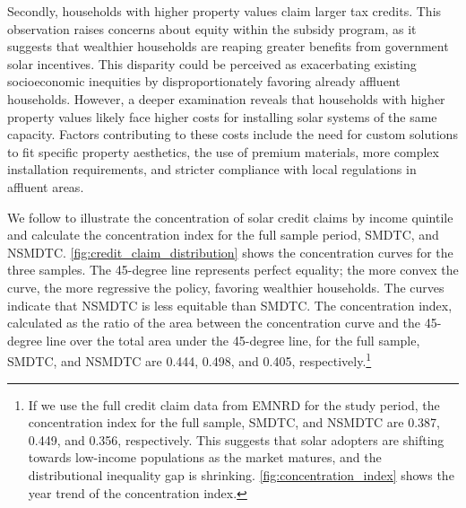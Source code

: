 \documentclass[12pt,twoside,letterpaper]{article}
\begin{document}
Secondly, households with higher property values claim larger tax credits. This observation raises concerns about equity within the subsidy program, as it suggests that wealthier households are reaping greater benefits from government solar incentives. This disparity could be perceived as exacerbating existing socioeconomic inequities by disproportionately favoring already affluent households. However, a deeper examination reveals that households with higher property values likely face higher costs for installing solar systems of the same capacity. Factors contributing to these costs include the need for custom solutions to fit specific property aesthetics, the use of premium materials, more complex installation requirements, and stricter compliance with local regulations in affluent areas. 


We follow \textcite{borenstein_distributional_2016} to illustrate the concentration of solar credit claims by income quintile and calculate the concentration index for the full sample period, SMDTC, and NSMDTC. \autoref{fig:credit_claim_distribution} shows the concentration curves for the three samples. The 45-degree line represents perfect equality; the more convex the curve, the more regressive the policy, favoring wealthier households. The curves indicate that NSMDTC is less equitable than SMDTC. The concentration index, calculated as the ratio of the area between the concentration curve and the 45-degree line over the total area under the 45-degree line, for the full sample, SMDTC, and NSMDTC are 0.444, 0.498, and 0.405, respectively.\footnote{If we use the full credit claim data from EMNRD for the study period, the concentration index for the full sample, SMDTC, and NSMDTC are 0.387, 0.449, and 0.356, respectively. This suggests that solar adopters are shifting towards low-income populations as the market matures, and the distributional inequality gap is shrinking. \autoref{fig:concentration_index} shows the year trend of the concentration index.}%
\end{document}
